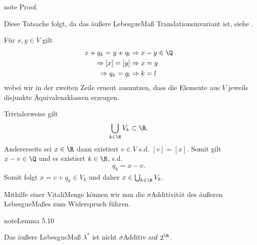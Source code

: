 \documentclass[letterpaper,10pt,german]{jupyterBook}
\begin{document}
\begin{sphinxadmonition}{note}
\sphinxAtStartPar
Proof. 

\sphinxAtStartPar
{}

\sphinxAtStartPar
Diese Tatsache folgt, da das äußere Lebesgue\sphinxhyphen{}Maß Translationsinvariant ist, siehe {\hyperref[\detokenize{masstheorie/masstheorie:rem:transinvariance}]{}}.

\sphinxAtStartPar
{}

\sphinxAtStartPar
Für \(x,y\in V\) gilt
\begin{equation*}
\begin{split}x + q_k = y + q_l&\Rightarrow x-y\in\Q\\
\Rightarrow [x]=[y]&\Rightarrow x=y\\
\Rightarrow q_k=q_l&\Rightarrow k=l\end{split}
\end{equation*}
\sphinxAtStartPar
wobei wir in der zweiten Zeile erneut ausnutzen, dass die Elemente aus \(V\) jeweils disjunkte Äquivalenzklassen erzeugen.

\sphinxAtStartPar
{}

\sphinxAtStartPar
Trivialerweise gilt
\begin{equation*}
\begin{split}\bigcup_{k\in\N} V_k \subset \R.\end{split}
\end{equation*}
\sphinxAtStartPar
Andererseits sei \(x\in\R\) dann existiert \(v\in V\) s.d. \([v] = [x]\). Somit gilt \(x-v\in\Q\) und es existiert \(k\in\N\), s.d.
\begin{equation*}
\begin{split}q_k = x-v.\end{split}
\end{equation*}
\sphinxAtStartPar
Somit folgt \(x=v+q_k\in V_k\) und daher \(x\in\bigcup_{k\in\N} V_k\).
\end{sphinxadmonition}

\sphinxAtStartPar
Mithilfe einer Vitali\sphinxhyphen{}Menge können wir nun die \(\sigma\)\sphinxhyphen{}Additivität des äußeren Lebesgue\sphinxhyphen{}Maßes zum Widerspruch führen.
\label{masstheorie/masstheorie:lemma-39}
\begin{sphinxadmonition}{note}{Lemma 5.10}



\sphinxAtStartPar
Das äußere Lebesgue\sphinxhyphen{}Maß \(\lambda^\ast\) ist nicht \(\sigma\)\sphinxhyphen{}Additiv auf \(2^{\R}\).
\end{sphinxadmonition}
\end{document}
